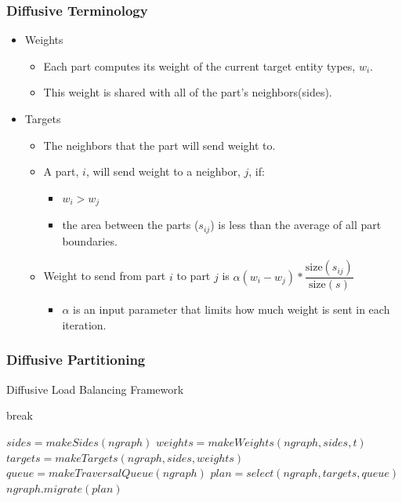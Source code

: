 \documentclass{beamer}
\begin{document}
\begin{frame}
  \frametitle{Diffusive Terminology}
  \begin{itemize}
  \item Weights
    \begin{itemize}
    \item Each part computes its weight of the current target entity types, $w_i$.
    \item This weight is shared with all of the part's neighbors(sides).
    \end{itemize}
  \item Targets
    \begin{itemize}
    \item The neighbors that the part will send weight to.
    \item A part, $i$, will send weight to a neighbor, $j$, if:
      \begin{itemize}
      \item $w_i>w_j$
      \item the area between the parts ($s_{ij}$) is less than the average of all part boundaries.  
      \end{itemize}
    \item Weight to send from part $i$ to part $j$ is $\alpha(w_i-w_j)*\dfrac{\text{size}(s_{ij})}{\text{size}(s)}$
      \begin{itemize}
        \item $\alpha$ is an input parameter that limits how much weight is sent in each iteration.
      \end{itemize}
    \end{itemize}
  \end{itemize}
\end{frame}

\begin{frame}
  \frametitle{Diffusive Partitioning}
  \begin{algorithm}[H]
    \caption{Diffusive Load Balancing Framework}
    \label{alg:engpar}
    \small
    \begin{algorithmic}[1]
      \State break
      \EndIf
      \EndWhile
      \EndFor
      \EndProcedure

      \State $sides = makeSides(ngraph)$
      \State $weights = makeWeights(ngraph,sides,t)$
      \State $targets = makeTargets(ngraph,sides,weights)$
      \State $queue = makeTraversalQueue(ngraph)$
      \State $plan = select(ngraph,targets,queue)$
      \State $ngraph.migrate(plan)$
      \EndProcedure
    \end{algorithmic}
  \end{algorithm}
\end{frame}
\end{document}

